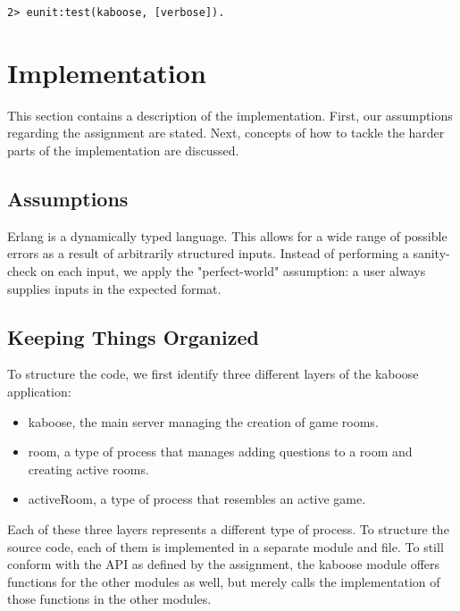 \documentclass[11pt, a4paper]{article}
\begin{document}
\begin{verbatim}
2> eunit:test(kaboose, [verbose]).
\end{verbatim}




\pagebreak
\section{Implementation}
This section contains a description of the implementation. First, our assumptions regarding the assignment are stated. Next, concepts of how to tackle the harder parts of the implementation are discussed.

\subsection{Assumptions} \label{perfect-world}
Erlang is a dynamically typed language. This allows for a wide range of possible errors as a result of arbitrarily structured inputs. Instead of performing a sanity-check on each input, we apply the "perfect-world" assumption: a user always supplies inputs in the expected format. 


\subsection{Keeping Things Organized}
To structure the code, we first identify three different layers of the kaboose application:
\begin{itemize}
	\item kaboose, the main server managing the creation of game rooms.
	\item room, a type of process that manages adding questions to a room and creating active rooms.
	\item activeRoom, a type of process that resembles an active game.
\end{itemize}
Each of these three layers represents a different type of process. To structure the source code, each of them is implemented in a separate module and file. To still conform with the API as defined by the assignment, the kaboose module offers functions for the other modules as well, but merely calls the implementation of those functions in the other modules.
\end{document}
